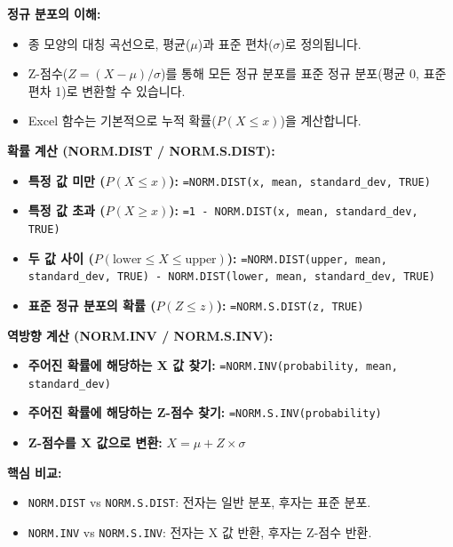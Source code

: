 \documentclass[11pt,a4paper]{article}
\theoremstyle{definition}
\begin{document}
\begin{tcolorbox}[colback=lightblue, colframe=darkblue, title=\textbf{Excel을 활용한 정규 분포 분석 핵심 요약}]
    \textbf{정규 분포의 이해:}
    \begin{itemize}
        \item 종 모양의 대칭 곡선으로, 평균($\mu$)과 표준 편차($\sigma$)로 정의됩니다.
        \item Z-점수($Z = (X - \mu) / \sigma$)를 통해 모든 정규 분포를 표준 정규 분포(평균 0, 표준 편차 1)로 변환할 수 있습니다.
        \item Excel 함수는 기본적으로 누적 확률($P(X \le x)$)을 계산합니다.
    \end{itemize}

    \textbf{확률 계산 (NORM.DIST / NORM.S.DIST):}
    \begin{itemize}
        \item \textbf{특정 값 미만 ($P(X \le x)$):}
        \texttt{=NORM.DIST(x, mean, standard\_dev, TRUE)}
        \item \textbf{특정 값 초과 ($P(X \ge x)$):}
        \texttt{=1 - NORM.DIST(x, mean, standard\_dev, TRUE)}
        \item \textbf{두 값 사이 ($P(\text{lower} \le X \le \text{upper})$):}
        \texttt{=NORM.DIST(upper, mean, standard\_dev, TRUE) - NORM.DIST(lower, mean, standard\_dev, TRUE)}
        \item \textbf{표준 정규 분포의 확률 ($P(Z \le z)$):}
        \texttt{=NORM.S.DIST(z, TRUE)}
    \end{itemize}

    \textbf{역방향 계산 (NORM.INV / NORM.S.INV):}
    \begin{itemize}
        \item \textbf{주어진 확률에 해당하는 X 값 찾기:}
        \texttt{=NORM.INV(probability, mean, standard\_dev)}
        \item \textbf{주어진 확률에 해당하는 Z-점수 찾기:}
        \texttt{=NORM.S.INV(probability)}
        \item \textbf{Z-점수를 X 값으로 변환:}
        $X = \mu + Z \times \sigma$
    \end{itemize}

    \textbf{핵심 비교:}
    \begin{itemize}
        \item \texttt{NORM.DIST} vs \texttt{NORM.S.DIST}: 전자는 일반 분포, 후자는 표준 분포.
        \item \texttt{NORM.INV} vs \texttt{NORM.S.INV}: 전자는 X 값 반환, 후자는 Z-점수 반환.
    \end{itemize}
\end{tcolorbox}
\end{document}
